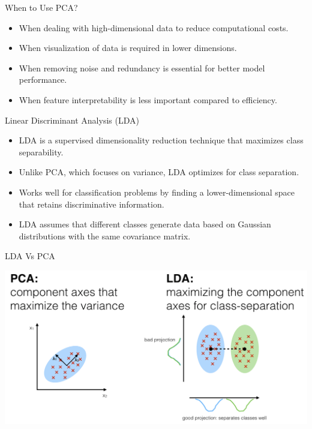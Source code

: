 \documentclass[11pt]{beamer}
\begin{document}
%
%
\begin{frame}{When to Use PCA?}
    \begin{itemize}
        \item When dealing with high-dimensional data to reduce computational costs.
        \item When visualization of data is required in lower dimensions.
        \item When removing noise and redundancy is essential for better model performance.
        \item When feature interpretability is less important compared to efficiency.
    \end{itemize}
\end{frame}
%
%
\begin{frame}{Linear Discriminant Analysis (LDA)}
    \begin{itemize}
        \item LDA is a supervised dimensionality reduction technique that maximizes class separability.
        \item Unlike PCA, which focuses on variance, LDA optimizes for class separation.
        \item Works well for classification problems by finding a lower-dimensional space that retains discriminative information.
        \item LDA assumes that different classes generate data based on Gaussian distributions with the same covariance matrix.
    \end{itemize}
\end{frame}
%
%
\begin{frame}{LDA Vs PCA}
	\begin{center}
	\includegraphics[scale=.375]{../05-pictures/lesson-2-2_pic_7.png}
	\end{center}
\end{frame}
\end{document}
